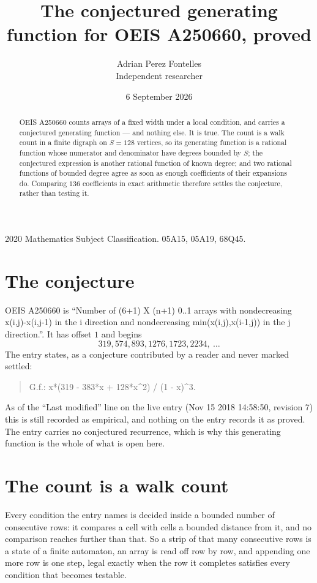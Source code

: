 \documentclass[11pt,a4paper]{article}
\title{The conjectured generating function for OEIS A250660, proved}
\author{Adrian Perez Fontelles\\ \small Independent researcher}
\date{6 September 2026}
\theoremstyle{plain}
\theoremstyle{definition}
\begin{document}
\maketitle

\begin{abstract}
OEIS A250660 counts arrays of a fixed width under a local condition, and carries a conjectured
generating function --- and nothing else. It is true. The count is a walk count in a finite
digraph on $S=128$ vertices, so its generating function is a rational function whose numerator
and denominator have degrees bounded by $S$; the conjectured expression is another rational
function of known degree; and two rational functions of bounded degree agree as soon as enough
coefficients of their expansions do. Comparing $136$ coefficients in exact arithmetic
therefore settles the conjecture, rather than testing it.
\end{abstract}

\noindent\small 2020 Mathematics Subject Classification. 05A15, 05A19, 68Q45.\normalsize

\section{The conjecture}

OEIS A250660 is ``Number of (6+1) X (n+1) 0..1 arrays with nondecreasing x(i,j)-x(i,j-1) in the i direction and nondecreasing min(x(i,j),x(i-1,j)) in the j direction.''. It has offset $1$ and begins
\[
319, 574, 893, 1276, 1723, 2234,\ \dots
\]
The entry states, as a conjecture contributed by a reader and never marked settled:
\begin{quote}
G.f.: x*(319 - 383*x + 128*x\^{}2) / (1 - x)\^{}3.
\end{quote}
As of the ``Last modified'' line on the live entry (Nov 15 2018 14:58:50, revision 7) this is still
recorded as empirical, and nothing on the entry records it as proved. The entry carries no
conjectured recurrence, which is why this generating function is the whole of what is open
here.

\section{The count is a walk count}

Every condition the entry names is decided inside a bounded number of consecutive rows: it
compares a cell with cells a bounded distance from it, and no comparison reaches further than
that. So a strip of that many consecutive rows is a state of a finite automaton, an array is
read off row by row, and appending one more row is one step, legal exactly when the row it
completes satisfies every condition that becomes testable.
\end{document}
